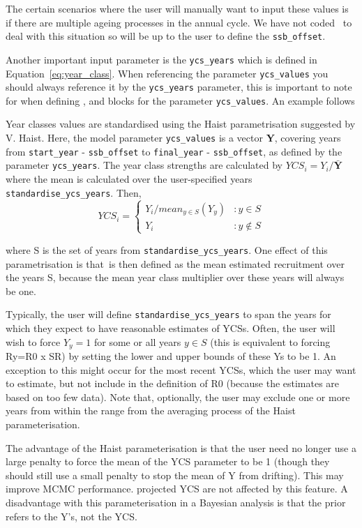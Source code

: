 The certain scenarios where the user will manually want to input these values is if there are multiple ageing processes in the annual cycle. We have not coded \CNAME\ to deal with this situation so will be up to the user to define the \texttt{ssb\_offset}.

Another important input parameter is the \texttt{ycs\_years} which is defined in Equation~\eqref{eq:year_class}. When referencing the parameter \texttt{ycs\_values} you should always reference it by the \texttt{ycs\_years} parameter, this is important to note for when defining ,  and  blocks for the parameter \texttt{ycs\_values}. An example follows

Year classes values are standardised using the Haist parametrisation suggested by V. Haist. Here, the model parameter \texttt{ycs\_values} is a vector \textbf{Y}, covering years from \texttt{start\_year} - \texttt{ssb\_offset} to \texttt{final\_year} - \texttt{ssb\_offset}, as defined by the parameter \texttt{ycs\_years}. The year class strengths are calculated by $YCS_i=Y_i/\bar{\textbf{Y}}$ where the mean is calculated over the user-specified years \texttt{standardise\_ycs\_years}. Then,
\[
YCS_i = 
\begin{cases}
Y_i / mean_{y \in S}(Y_y) & :y \in S\\
Y_i					 & :y \notin S
\end{cases}
\]

where S is the set of years from \texttt{standardise\_ycs\_years}. One effect of this parametrisation is that\Rzero\ is then defined as the mean estimated recruitment over the years S, because the mean year class multiplier over these years will always be one.

Typically, the user will define \texttt{standardise\_ycs\_years} to span the years for which they expect to have reasonable estimates of YCSs. Often, the user will wish to force $Y_y=1$ for some or all years $y\in S$ (this is equivalent to forcing Ry=R0 x SR) by setting the lower and upper bounds of these Ys to be 1. An exception to this might occur for the most recent YCSs, which the user may want to estimate, but not include in the definition of R0 (because the estimates are based on too few data). Note that, optionally, the user may exclude one or more years from within the range from the averaging process of the Haist parameterisation. 

The advantage of the Haist parameterisation is that the user need no longer use a large penalty to force the mean of the YCS parameter to be 1 (though they should still use a small penalty to stop the mean of Y from drifting). This may improve MCMC performance.  projected YCS are not affected by this feature. A disadvantage with this parameterisation in a Bayesian analysis is that the prior refers to the Y’s, not the YCS.

